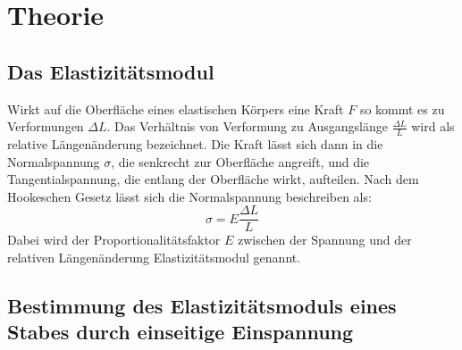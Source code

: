 \section{Theorie}
\label{sec:Theorie}


\subsection{Das Elastizitätsmodul}

Wirkt auf die Oberfläche eines elastischen Körpers eine Kraft $F$ so kommt es zu Verformungen $\Delta L$.
Das Verhältnis von Verformung zu Ausgangslänge $\frac{\Delta L}{L}$ wird als relative Längenänderung bezeichnet.
Die Kraft lässt sich dann in die Normalspannung $\sigma$, die senkrecht zur Oberfläche angreift, und die Tangentialspannung, die entlang der Oberfläche wirkt, aufteilen.
Nach dem Hookeschen Gesetz lässt sich die Normalspannung beschreiben als:
\begin{equation}
\sigma = E \frac{\Delta L}{L} \label{eq:Hooke}
\end{equation}
Dabei wird der Proportionalitätsfaktor $E$ zwischen der Spannung und der relativen Längenänderung Elastizitätsmodul genannt.

\subsection{Bestimmung des Elastizitätsmoduls eines Stabes durch einseitige Einspannung}

